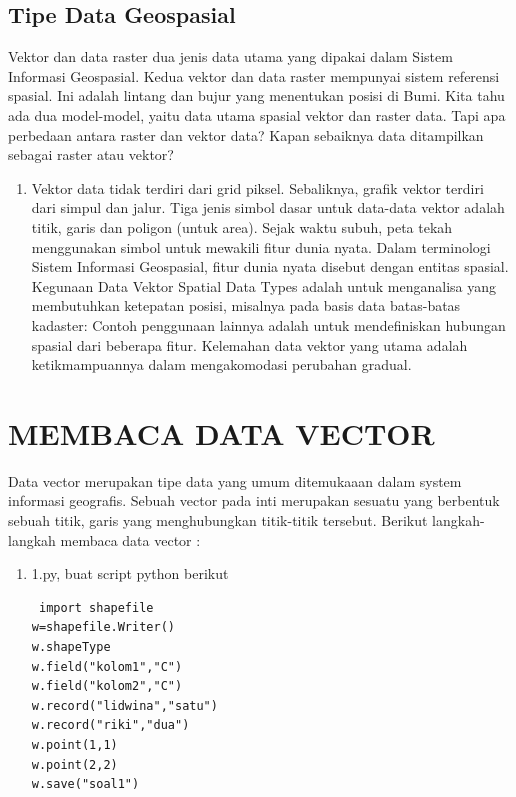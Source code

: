 \subsection{Tipe Data Geospasial}
Vektor dan data raster dua jenis data utama yang dipakai dalam Sistem Informasi Geospasial. Kedua vektor dan data raster mempunyai sistem referensi spasial. Ini adalah lintang dan bujur yang menentukan posisi di Bumi. Kita tahu ada dua model-model, yaitu data utama spasial vektor dan raster data. Tapi apa perbedaan antara raster dan vektor data? Kapan sebaiknya data ditampilkan sebagai raster atau vektor?
\begin{enumerate}
\item Vektor data tidak terdiri dari grid piksel. Sebaliknya, grafik vektor terdiri dari simpul dan jalur. Tiga jenis simbol dasar untuk data-data vektor adalah titik, garis dan poligon (untuk area). Sejak waktu subuh, peta tekah menggunakan simbol untuk mewakili fitur dunia nyata. Dalam terminologi Sistem Informasi Geospasial, fitur dunia nyata disebut dengan entitas spasial. 
Kegunaan Data Vektor Spatial Data Types adalah untuk menganalisa yang membutuhkan ketepatan posisi, misalnya pada basis data batas-batas kadaster: Contoh penggunaan lainnya adalah untuk mendefiniskan hubungan spasial dari beberapa fitur. Kelemahan data vektor yang utama adalah ketikmampuannya dalam mengakomodasi perubahan gradual. 

\end{enumerate}


\section{MEMBACA DATA VECTOR}
Data vector merupakan tipe data yang umum ditemukaaan dalam system informasi geografis. Sebuah vector pada inti merupakan sesuatu yang berbentuk sebuah titik, garis yang menghubungkan titik-titik tersebut.
Berikut langkah-langkah membaca data vector :
\begin{enumerate}
\item 1.py, buat script python berikut
\begin{lstlisting}
 import shapefile         
w=shapefile.Writer()
w.shapeType                 	
w.field("kolom1","C")
w.field("kolom2","C")
w.record("lidwina","satu")
w.record("riki","dua")
w.point(1,1)                  	  
w.point(2,2)
w.save("soal1")
\end{lstlisting}
\end{enumerate}